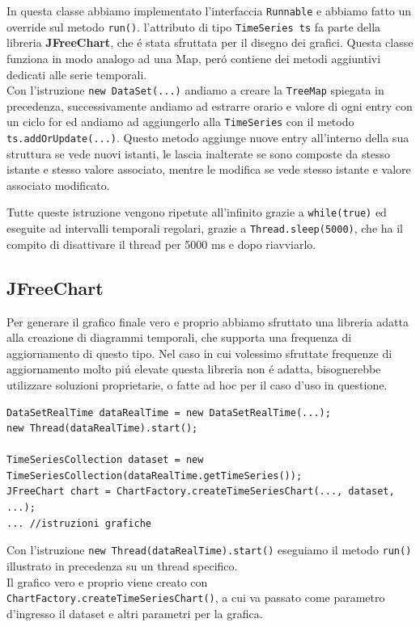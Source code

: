 In questa classe abbiamo implementato l'interfaccia \texttt{Runnable} e abbiamo fatto un override sul metodo \texttt{run()}.
l'attributo di tipo \texttt{TimeSeries ts} fa parte della libreria \textbf{JFreeChart}, che é stata sfruttata per il disegno dei grafici.
Questa classe funziona in modo analogo ad una Map, peró contiene dei metodi aggiuntivi dedicati alle serie temporali.\\
Con l'istruzione \texttt{new DataSet(...)} andiamo a creare la \texttt{TreeMap} spiegata in precedenza, successivamente
andiamo ad estrarre orario e valore di ogni entry con un ciclo for ed andiamo ad aggiungerlo alla \texttt{TimeSeries} con
il metodo \texttt{ts.addOrUpdate(...)}. Questo metodo aggiunge nuove entry all'interno della sua struttura se vede nuovi istanti,
le lascia inalterate se sono composte da stesso istante e stesso valore associato, mentre le modifica se vede stesso istante e valore associato
modificato.

Tutte queste istruzione vengono ripetute all'infinito grazie a \texttt{while(true)} ed eseguite ad intervalli temporali regolari,
grazie a \texttt{Thread.sleep(5000)}, che ha il compito di disattivare il thread per 5000 ms e dopo riavviarlo.


\subsection{JFreeChart}
Per generare il grafico finale vero e proprio abbiamo sfruttato una libreria adatta alla creazione di diagrammi temporali, che supporta una frequenza di
aggiornamento di questo tipo. Nel caso in cui volessimo sfruttate frequenze di aggiornamento molto piú elevate questa libreria non é adatta,
bisognerebbe utilizzare soluzioni proprietarie, o fatte ad hoc per il caso d'uso in questione.

\begin{lstlisting}[autogobble, title={\texttt{DataSetRealTime.java}}]
DataSetRealTime dataRealTime = new DataSetRealTime(...);
new Thread(dataRealTime).start();

TimeSeriesCollection dataset = new TimeSeriesCollection(dataRealTime.getTimeSeries());
JFreeChart chart = ChartFactory.createTimeSeriesChart(..., dataset, ...);
... //istruzioni grafiche
\end{lstlisting}

Con l'istruzione \texttt{new Thread(dataRealTime).start()} eseguiamo il metodo \texttt{run()}
illustrato in precedenza su un thread specifico.\\
Il grafico vero e proprio viene creato con \texttt{ChartFactory.createTimeSeriesChart()}, a cui
va passato come parametro d'ingresso il dataset e altri parametri per la grafica.


